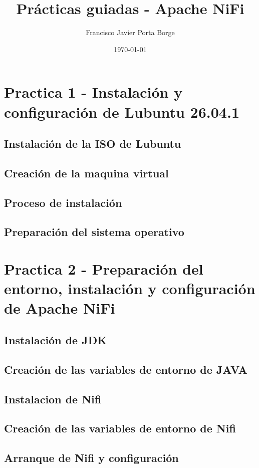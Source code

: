 \documentclass[12pt,a4paper]{article}
\title{Prácticas guiadas - Apache NiFi}
\author{Francisco Javier Porta Borge}
\date{\today}
\begin{document}
\maketitle

\tableofcontents




\section{Practica 1 - Instalación y configuración de Lubuntu 26.04.1}
\subsection{Instalación de la ISO de Lubuntu}
\subsection{Creación de la maquina virtual}
\subsection{Proceso de instalación}
\subsection{Preparación del sistema operativo}
\section{Practica 2 - Preparación del entorno, instalación y configuración de Apache NiFi}
\subsection{Instalación de JDK}
\subsection{Creación de las variables de entorno de JAVA}
\subsection{Instalacion de Nifi}
\subsection{Creación de las variables de entorno de Nifi}
\subsection{Arranque de Nifi y configuración}
\end{document}
